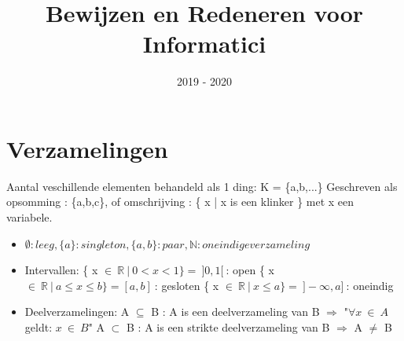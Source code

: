 \documentclass{article}
\title{Bewijzen en Redeneren voor Informatici}
\date{2019 - 2020}
\begin{document}
\maketitle
\tableofcontents

\section{Verzamelingen}

Aantal veschillende elementen behandeld als 1 ding: K = \{a,b,...\}
Geschreven als opsomming : \{a,b,c\}, of omschrijving : \{ x \big| x is een klinker \} met x een variabele.

\begin{itemize}
\item $\emptyset : leeg , \{a\} : singleton , \{a,b\} : paar, \mathbb{N} : oneindige verzameling$
\item Intervallen: \newline
    \{ x $\in \: \mathbb{R} \: \big| \: 0 < x < 1 \} = \: ]0,1[ \: $: open \newline
    \{ x $\in \: \mathbb{R} \: \big| \: a \leq x \leq b \} = [a,b] \: $: gesloten \newline
    \{ x $\in \: \mathbb{R} \: \big| \: x \leq a \} = \: ]-\infty,a] \: $: oneindig
\item Deelverzamelingen: \newline
    A $\subseteq$ B : A is een deelverzameling van B $\Rightarrow$ "$\forall x \: \in \: A$ geldt: $x \: \in \: B$" \newline
    A $\subset$ B : A is een strikte deelverzameling van B $\Rightarrow$ A $\neq$ B
\end{itemize}
\end{document}
